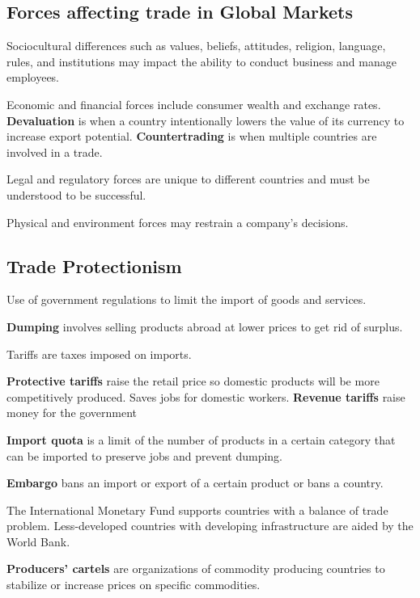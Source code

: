 \documentclass[english, 12pt]{article}
\begin{document}
\subsection{Forces affecting trade in Global Markets}
\begin{defn}
Sociocultural differences such as values, beliefs, attitudes, religion, language, rules, and institutions may impact the ability to conduct business and manage employees.
\end{defn}
\begin{defn}
Economic and financial forces include consumer wealth and exchange rates. \textbf{Devaluation} is when a country intentionally lowers the value of its currency to increase export potential. \textbf{Countertrading} is when multiple countries are involved in a trade.
\end{defn}
\begin{defn}
Legal and regulatory forces are unique to different countries and must be understood to be successful.
\end{defn}

\begin{defn}
Physical and environment forces may restrain a company's decisions.
\end{defn}

\subsection{Trade Protectionism}
Use of government regulations to limit the import of goods and services.
\begin{defn}
\textbf{Dumping} involves selling products abroad at lower prices to get rid of surplus.
\end{defn}
\begin{defn}
Tariffs are taxes imposed on imports.
\end{defn}
\begin{defn}
\textbf{Protective tariffs} raise the retail price so domestic products will be more competitively produced. Saves jobs for domestic workers. \textbf{Revenue tariffs} raise money for the government
\end{defn}
\begin{defn}
\textbf{Import quota} is a limit of the number of products in a certain category that can be imported to preserve jobs and prevent dumping.
\end{defn}
\begin{defn}
\textbf{Embargo} bans an import or export of a certain product or bans a country.
\end{defn}
The International Monetary Fund supports countries with a balance of trade problem. Less-developed countries with developing infrastructure are aided by the World Bank.
\begin{defn}
\textbf{Producers' cartels} are organizations of commodity producing countries to stabilize or increase prices on specific commodities.
\end{defn}
\end{document}
